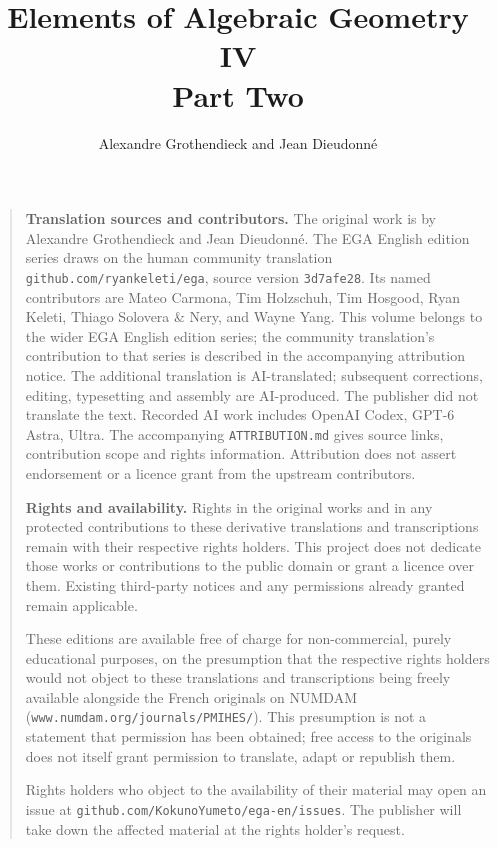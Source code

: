 


\setlength{\emergencystretch}{3em}




\title{Elements of Algebraic Geometry IV\\Part Two}
\author{Alexandre Grothendieck and Jean Dieudonn\'e}
\date{}
\maketitle


\begingroup
\small
\begin{quote}
\textbf{Translation sources and contributors.}
The original work is by Alexandre Grothendieck and Jean Dieudonn\'e.
The EGA English edition series draws on the human community translation
\texttt{github.com/ryankeleti/ega}, source version \texttt{3d7afe28}.
Its named contributors are Mateo Carmona, Tim Holzschuh, Tim Hosgood,
Ryan Keleti, Thiago Solovera \& Nery, and Wayne Yang.
This volume belongs to the wider EGA English edition series; the community translation's contribution to that series is described in the accompanying attribution notice.
The additional translation is AI-translated; subsequent corrections, editing,
typesetting and assembly are AI-produced. The publisher did not translate
the text. Recorded AI work includes OpenAI Codex,
GPT-6 Astra, Ultra.
The accompanying \texttt{ATTRIBUTION.md} gives source links, contribution
scope and rights information. Attribution does not assert endorsement
or a licence grant from the upstream contributors.

\medskip
\textbf{Rights and availability.}
Rights in the original works and in any protected contributions to these
derivative translations and transcriptions remain with their respective
rights holders. This project does not dedicate those works or contributions
to the public domain or grant a licence over them. Existing third-party
notices and any permissions already granted remain applicable.

These editions are available free of charge for non-commercial, purely
educational purposes, on the presumption that the respective rights holders
would not object to these translations and transcriptions being freely
available alongside the French originals on NUMDAM
(\texttt{www.numdam.org/journals/PMIHES/}). This presumption is not a statement
that permission has been obtained; free access to the originals does not
itself grant permission to translate, adapt or republish them.

Rights holders who object to the availability of their material may open
an issue at \texttt{github.com/KokunoYumeto/ega-en/issues}. The publisher
will take down the affected material at the rights holder's request.
\end{quote}
\endgroup


